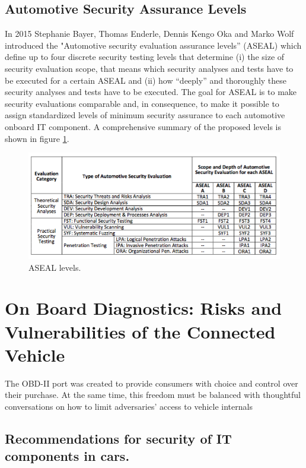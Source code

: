 \documentclass[11pt]{article}
\begin{document}
\subsection{Automotive Security Assurance Levels}

In 2015 Stephanie Bayer, Thomas Enderle, Dennis Kengo Oka and Marko Wolf introduced the "Automotive security evaluation assurance levels” (ASEAL) which define up to four discrete security testing levels that determine (i) the size of security evaluation scope, that means which security analyses and tests have to be executed for a certain ASEAL and (ii) how “deeply” and thoroughly these security analyses and tests have to be executed. The goal for ASEAL is to make security evaluations comparable and, in consequence, to make it possible to assign standardized levels of minimum security assurance to each automotive onboard IT component. \cite{Bayer15} A comprehensive summary of the proposed levels is shown in figure \ref{fig:aseal}.

\begin{figure}[h]
	\caption{ASEAL levels.}
	\label{fig:aseal}
	\centering
	\includegraphics[width=\textwidth]{ASEAL.png}
\end{figure}




\section{On Board Diagnostics: Risks and Vulnerabilities of the Connected Vehicle}

The OBD-II port was created to provide consumers with choice and control over their purchase. At the same time, this freedom must be balanced with thoughtful conversations on how to limit adversaries’ access to vehicle internals

\subsection{Recommendations for security of IT components in cars.}
\end{document}
